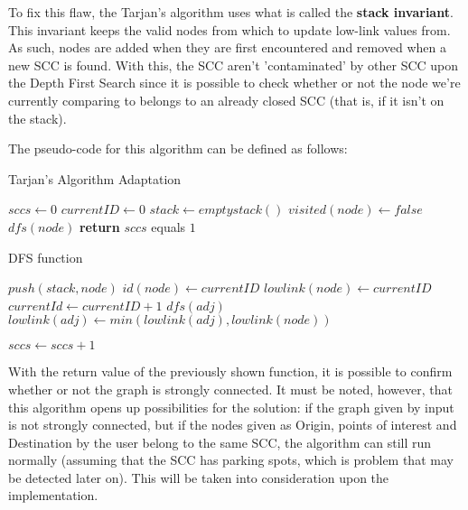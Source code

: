 \documentclass[a4paper, 12pt]{report}
\begin{document}
    To fix this flaw, the Tarjan's algorithm uses what is called the \textbf{stack invariant}. This invariant keeps the valid nodes from which to update low-link values from. As such, nodes are added when they are first encountered and removed when a new SCC is found. With this, the SCC aren't 'contaminated' by other SCC upon the Depth First Search since it is possible to check whether or not the node we're currently comparing to belongs to an already closed SCC (that is, if it isn't on the stack).
    
    The pseudo-code for this algorithm can be defined as follows:
    
    \begin{algorithm}[H]
    	\caption{Tarjan's Algorithm Adaptation} 
	    \begin{algorithmic}[1]
	    \State $sccs \leftarrow 0$
	    \State $currentID \leftarrow 0$
	    \State $stack \leftarrow emptystack()$
	    \State
	        \State $visited(node) \leftarrow false$
	    \EndFor
	            \State $dfs(node)$
	        \EndIf
	    \EndFor
		\State \textbf{return} $sccs$ equals $1$
	    \end{algorithmic} 
    \end{algorithm}
    \begin{algorithm}[H]
    	\caption{DFS function}
    	\begin{algorithmic}[1]
	        \State $push(stack, node)$
	        \State $id(node) \leftarrow currentID$
	        \State $lowlink(node) \leftarrow currentID$
	        \State $currentId \leftarrow currentID + 1$
	        \State
	                \State $dfs(adj)$
	            \EndIf
	                \State $lowlink(adj) \leftarrow min(lowlink(adj), lowlink(node))$
	            \EndIf
	        \EndFor
	        
	        \State
	            \EndWhile
	            \State $sccs \leftarrow sccs + 1$
	        \EndIf
	    \end{algorithmic} 
    \end{algorithm}

        
    With the return value of the previously shown function, it is possible to confirm whether or not the graph is strongly connected. It must be noted, however, that this algorithm opens up possibilities for the solution: if the graph given by input is not strongly connected, but if the nodes given as Origin, points of interest and Destination by the user belong to the same SCC, the algorithm can still run normally (assuming that the SCC has parking spots, which is problem that may be detected later on). This will be taken into consideration upon the implementation.
    
\end{document}
